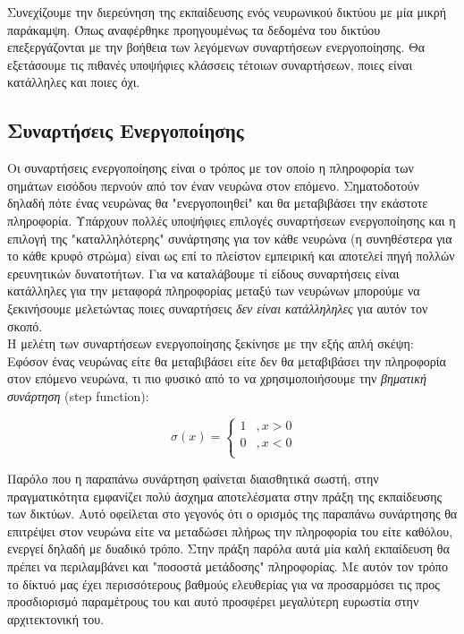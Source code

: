\documentclass[11pt]{article} %
\numberwithin{equation}{subsection}
\begin{document}
Συνεχίζουμε την διερεύνηση της εκπαίδευσης ενός νευρωνικού δικτύου με μία μικρή παράκαμψη. Όπως αναφέρθηκε προηγουμένως τα δεδομένα του δικτύου επεξεργάζονται με την βοήθεια των λεγόμενων συναρτήσεων ενεργοποίησης. Θα εξετάσουμε τις πιθανές υποψήφιες κλάσσεις τέτοιων συναρτήσεων, ποιες είναι κατάλληλες και ποιες όχι.

\subsection{Συναρτήσεις Ενεργοποίησης}

Οι συναρτήσεις ενεργοποίησης είναι ο τρόπος με τον οποίο η πληροφορία των σημάτων εισόδου περνούν από τον έναν νευρώνα στον επόμενο. Σηματοδοτούν δηλαδή πότε ένας νευρώνας θα "ενεργοποιηθεί" και θα μεταβιβάσει την εκάστοτε πληροφορία. Υπάρχουν πολλές υποψήφιες επιλογές συναρτήσεων ενεργοποίησης και η επιλογή της "καταλληλότερης" συνάρτησης για τον κάθε νευρώνα (η συνηθέστερα για το κάθε κρυφό στρώμα) είναι ως επί το πλείστον εμπειρική και αποτελεί πηγή πολλών ερευνητικών δυνατοτήτων. Για να καταλάβουμε τί είδους συναρτήσεις είναι κατάλληλες για την μεταφορά πληροφορίας μεταξύ των νευρώνων μπορούμε να ξεκινήσουμε μελετώντας ποιες συναρτήσεις \textit{δεν είναι κατάλληληλες} για αυτόν τον σκοπό.\\

Η μελέτη των συναρτήσεων ενεργοποίησης ξεκίνησε με την εξής απλή σκέψη: Εφόσον ένας νευρώνας είτε θα μεταβιβάσει είτε δεν θα μεταβιβάσει την πληροφορία στον επόμενο νευρώνα, τι πιο φυσικό από το να χρησιμοποιήσουμε την \textit{βηματική συνάρτηση} (step function): 

\[ 
\ \sigma(x) = \left\{
\begin{array}{ll}
      1 & , x > 0 \\
      0 & , x < 0 \\
\end{array} 
\right. 
\]

Παρόλο που η παραπάνω συνάρτηση φαίνεται διαισθητικά σωστή, στην πραγματικότητα εμφανίζει πολύ άσχημα αποτελέσματα στην πράξη της εκπαίδευσης των δικτύων. Αυτό οφείλεται στο γεγονός ότι ο ορισμός της παραπάνω συνάρτησης θα επιτρέψει στον νευρώνα είτε να μεταδώσει πλήρως την πληροφορία του είτε καθόλου, ενεργεί δηλαδή με δυαδικό τρόπο. Στην πράξη παρόλα αυτά μία καλή εκπαίδευση θα πρέπει να περιλαμβάνει και "ποσοστά μετάδοσης" πληροφορίας. Με αυτόν τον τρόπο το δίκτυό μας έχει περισσότερους βαθμούς ελευθερίας για να προσαρμόσει τις προς προσδιορισμό παραμέτρους του και αυτό προσφέρει μεγαλύτερη ευρωστία στην αρχιτεκτονική του. \\
\end{document}
